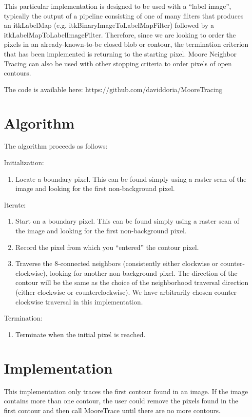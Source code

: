 \documentclass{InsightArticle}
\begin{document}
This particular implementation is designed to be used with a ``label image'', typically the output of a pipeline consisting of one of many filters that produces an itkLabelMap (e.g. itkBinaryImageToLabelMapFilter) followed by a itkLabelMapToLabelImageFilter. Therefore, since we are looking to order the pixels in an already-known-to-be closed blob or contour, the termination criterion that has been implemented is returning to the starting pixel. Moore Neighbor Tracing can also be used with other stopping criteria to order pixels of open contours.

The code is available here:
https://github.com/daviddoria/MooreTracing

\section{Algorithm}
The algorithm proceeds as follows:

Initialization:
\begin{enumerate}
\item Locate a boundary pixel. This can be found simply using a raster scan of the image and looking for the first non-background pixel.
\end{enumerate}

Iterate:
\begin{enumerate}
  \item Start on a boundary pixel. This can be found simply using a raster scan of the image and looking for the first non-background pixel.
 \item Record the pixel from which you ``entered'' the contour pixel.
 \item Traverse the 8-connected neighbors (consistently either clockwise or counter-clockwise), looking for another non-background pixel. The direction of the contour will be the same as the choice of the neighborhood traversal direction (either clockwise or counterclockwise). We have arbitrarily chosen counter-clockwise traversal in this implementation.
\end{enumerate}

Termination:
\begin{enumerate}
 \item Terminate when the initial pixel is reached.
\end{enumerate}

\section{Implementation}
This implementation only traces the first contour found in an image. If the image contains more than one contour, the user could remove the pixels found in the first contour and then call MooreTrace until there are no more contours.
\end{document}
